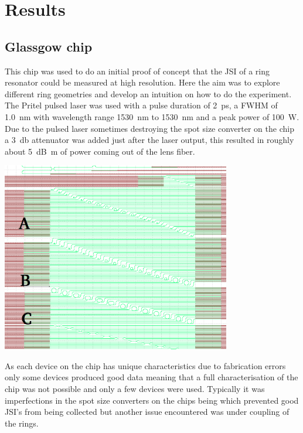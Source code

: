 \newpage
\section{Results}
\subsection{Glassgow chip}
This chip was used to do an initial proof of concept that the JSI of a ring resonator could be measured at high resolution. Here the aim was to explore different ring geometries and develop an intuition on how to do the experiment. The Pritel pulsed laser was used with a pulse duration of \SI{2}{\pico\second}, a FWHM of \SI{1.0}{\nano\meter} with wavelength range \SI{1530}{\nano\meter} to \SI{1530}{\nano\meter} and a peak power of \SI{100}{\watt}. Due to the pulsed laser sometimes destroying the spot size converter on the chip a \SI{3}{\decibel} attenuator was added just after the laser output, this resulted in roughly about \SI{5}{\deci\bel\m} of power coming out of the lens fiber.

\begingroup
    \centering  
    \includegraphics[width=10cm]{img/method/glassgowChipNumbering.png}
     \vspace{3pt} \label{glassgowChip}
\endgroup

As each device on the chip has unique characteristics due to fabrication errors only some devices produced good data meaning that a full characterisation of the chip was not possible and only a few devices were used. Typically it was imperfections in the spot size converters on the chips being which prevented good JSI's from being collected but another issue encountered was under coupling of the rings.

